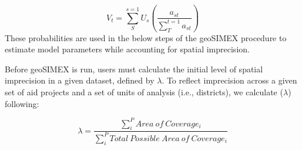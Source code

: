 \begin{equation}\label{eq:overlaps}
V_{t} = \sum_{S}^{s=1}U_{s}\left ( \frac{a_{st}}{\sum_{T}^{t=1}a_{st}} \right )
\end{equation}
\noindent 
These probabilities are used in the below steps of the geoSIMEX procedure to estimate model parameters while accounting for spatial imprecision.
\par
Before geoSIMEX is run, users must calculate the initial level of spatial imprecision in a given dataset, defined by $\lambda$.
To reflect imprecision across a given set of aid projects and a set of units of analysis (i.e., districts), we calculate (\begin{math}\lambda\end{math}) following:

\begin{equation}\label{lambda}
\lambda = \frac{\sum_{i}^{P}Area \ of \ Coverage_i}{\sum_{i}^{P}Total \ Possible \ Area \ of \ Coverage_i}
\end{equation}


